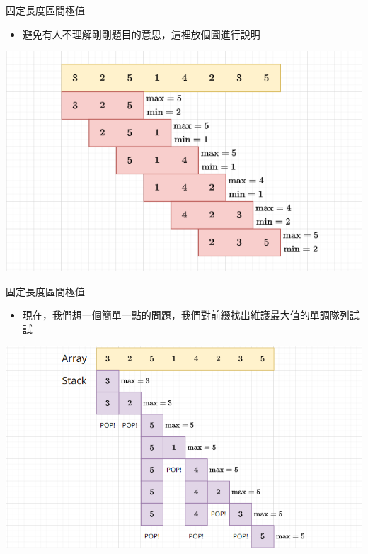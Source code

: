 \documentclass[aspectratio=169]{beamer}
\begin{document}
    \begin{frame}{固定長度區間極值}
        \begin{itemize}
            \item 避免有人不理解剛剛題目的意思，這裡放個圖進行說明
        \end{itemize}
        \begin{center}
            \includegraphics[scale=0.6]{images/sliding_max_min.png}
        \end{center}
    \end{frame}
    
    \begin{frame}[fragile]{固定長度區間極值}
        \begin{itemize}
            \item 現在，我們想一個簡單一點的問題，我們對前綴找出維護最大值的單調隊列試試
        \end{itemize}
        \begin{center}
            \includegraphics[scale=0.45]{images/prefix_max.png}
        \end{center}
    \end{frame}
    
\end{document}
